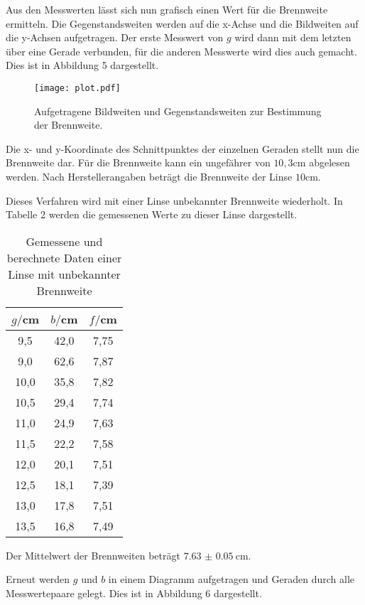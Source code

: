 Aus den Messwerten lässt sich nun grafisch einen Wert für die Brennweite ermitteln. Die Gegenstandsweiten
werden auf die x-Achse und die Bildweiten auf die y-Achsen aufgetragen. Der erste Messwert von $g$ wird dann mit
dem letzten über eine Gerade verbunden, für die anderen Messwerte wird dies auch gemacht. Dies ist in
Abbildung 5 dargestellt.




\begin{figure}[H]
  \centering
  \texttt{[image: plot.pdf]}
  \caption{Aufgetragene Bildweiten und Gegenstandsweiten zur Bestimmung der Brennweite.}
  \label{fig:plot}
\end{figure}


Die x- und y-Koordinate des Schnittpunktes der einzelnen Geraden stellt nun die Brennweite dar. Für die Brennweite kann
ein ungefährer von $10,3$cm abgelesen werden. Nach Herstellerangaben beträgt die Brennweite der Linse $10$cm.



Dieses Verfahren wird mit einer Linse unbekannter Brennweite wiederholt. In Tabelle 2 werden
die gemessenen Werte zu dieser Linse dargestellt.

\begin{table}[H]
  \centering
  \caption{Gemessene und berechnete Daten einer Linse mit unbekannter Brennweite}
  \label{tab:Widerstand}
  \begin{tabular}{c c c}
    \toprule
    $g/$cm  & $b/$cm & $f/$cm \\
    \midrule
    9,5     &     42,0 & 7,75 \\
    9,0     &     62,6 & 7,87 \\
    10,0    &     35,8 & 7,82 \\
    10,5    &     29,4 & 7,74 \\
    11,0    &     24,9 & 7,63 \\
    11,5    &     22,2 & 7,58 \\
    12,0    &     20,1 & 7,51 \\
    12,5    &     18,1 & 7,39 \\
    13,0    &     17,8 & 7,51 \\
    13,5    &     16,8 & 7,49 \\
    \bottomrule
  \end{tabular}
\end{table}

Der Mittelwert der Brennweiten beträgt $\SI{7.63(5)}{\centi\meter}$.

Erneut werden $g$ und $b$ in einem Diagramm aufgetragen und Geraden durch alle Messwertepaare gelegt. Dies ist in Abbildung 6
dargestellt.

